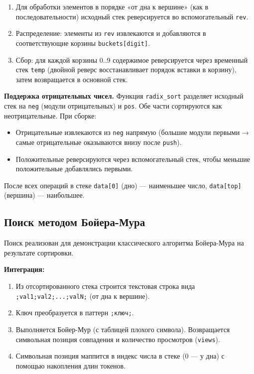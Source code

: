 \documentclass[a4paper,14pt]{extarticle}
\begin{document}
\begin{enumerate}
  \item Для обработки элементов в порядке «от дна к вершине» (как в последовательности) исходный стек реверсируется во вспомогательный \texttt{rev}.
  \item Распределение: элементы из \texttt{rev} извлекаются и добавляются в соответствующие корзины \texttt{buckets[digit]}.
  \item Сбор: для каждой корзины 0..9 содержимое реверсируется через временный стек \texttt{temp} (двойной реверс восстанавливает порядок вставки в корзину), затем возвращается в основной стек.
\end{enumerate}

\textbf{Поддержка отрицательных чисел.} Функция \texttt{radix\_sort} разделяет исходный стек на \texttt{neg} (модули отрицательных) и \texttt{pos}. Обе части сортируются как неотрицательные. При сборке:

\begin{itemize}
  \item Отрицательные извлекаются из \texttt{neg} напрямую (большие модули первыми → самые отрицательные оказываются внизу после \texttt{push}).
  \item Положительные реверсируются через вспомогательный стек, чтобы меньшие положительные добавлялись первыми.
\end{itemize}

После всех операций в стеке \texttt{data[0]} (дно) — наименьшее число, \texttt{data[top]} (вершина) — наибольшее.

\subsection{Поиск методом Бойера-Мура}

Поиск реализован для демонстрации классического алгоритма Бойера-Мура на результате сортировки.

\textbf{Интеграция:}
\begin{enumerate}
  \item Из отсортированного стека строится текстовая строка вида \texttt{;val1;val2;...;valN;} (от дна к вершине).
  \item Ключ преобразуется в паттерн \texttt{;ключ;}.
  \item Выполняется Бойер-Мур (с таблицей плохого символа). Возвращается символьная позиция совпадения и количество просмотров (\texttt{views}).
  \item Символьная позиция маппится в индекс числа в стеке (0 — у дна) с помощью накопления длин токенов.
\end{enumerate}
\end{document}
